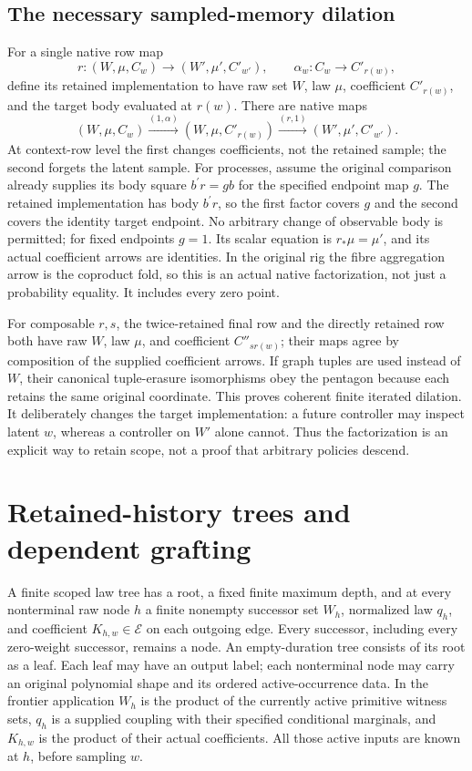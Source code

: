 \documentclass[11pt]{article}
\begin{document}
\subsection{The necessary sampled-memory dilation}
For a single native row map
\[
 r:(W,\mu,C_w)\longrightarrow(W',\mu',C'_{w'}),
 \qquad \alpha_w:C_w\to C'_{r(w)},
\]
define its retained implementation to have raw set $W$, law $\mu$, coefficient $C'_{r(w)}$, and the target body evaluated at $r(w)$. There are native maps
\[
 (W,\mu,C_w)\xrightarrow{(1,\alpha)}
 (W,\mu,C'_{r(w)})\xrightarrow{(r,1)}
 (W',\mu',C'_{w'}).
\]
At context-row level the first changes coefficients, not the retained sample; the second forgets the latent sample. For processes, assume the original comparison already supplies its body square $b^{\prime}r=g b$ for the specified endpoint map $g$. The retained implementation has body $b^{\prime}r$, so the first factor covers $g$ and the second covers the identity target endpoint. No arbitrary change of observable body is permitted; for fixed endpoints $g=1$. Its scalar equation is $r_*\mu=\mu'$, and its actual coefficient arrows are identities. In the original rig the fibre aggregation arrow is the coproduct fold, so this is an actual native factorization, not just a probability equality. It includes every zero point.

For composable $r,s$, the twice-retained final row and the directly retained row both have raw $W$, law $\mu$, and coefficient $C''_{sr(w)}$; their maps agree by composition of the supplied coefficient arrows. If graph tuples are used instead of $W$, their canonical tuple-erasure isomorphisms obey the pentagon because each retains the same original coordinate. This proves coherent finite iterated dilation. It deliberately changes the target implementation: a future controller may inspect latent $w$, whereas a controller on $W'$ alone cannot. Thus the factorization is an explicit way to retain scope, not a proof that arbitrary policies descend.

\section{Retained-history trees and dependent grafting}
A finite scoped law tree has a root, a fixed finite maximum depth, and at every nonterminal raw node $h$ a finite nonempty successor set $W_h$, normalized law $q_h$, and coefficient $K_{h,w}\in\mathcal E$ on each outgoing edge. Every successor, including every zero-weight successor, remains a node. An empty-duration tree consists of its root as a leaf. Each leaf may have an output label; each nonterminal node may carry an original polynomial shape and its ordered active-occurrence data. In the frontier application $W_h$ is the product of the currently active primitive witness sets, $q_h$ is a supplied coupling with their specified conditional marginals, and $K_{h,w}$ is the product of their actual coefficients. All those active inputs are known at $h$, before sampling $w$.
\end{document}
